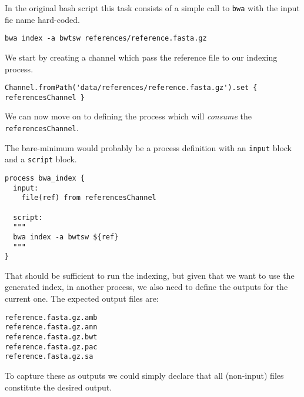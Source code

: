 In the original bash script this task consists of a simple call to \texttt{bwa} with 
the input fie name hard-coded. %

\begin{lstlisting}
bwa index -a bwtsw references/reference.fasta.gz
\end{lstlisting}

We start by creating a channel which pass the reference file to our indexing process. 

\begin{lstlisting}
Channel.fromPath('data/references/reference.fasta.gz').set { referencesChannel } 
\end{lstlisting}

We can now move on to defining the process which will \emph{consume} the \texttt{referencesChannel}.

The bare-minimum would probably be a process definition with 
an \texttt{input} block and a \texttt{script} block.

\begin{lstlisting}
process bwa_index {
  input:
    file(ref) from referencesChannel

  script:
  """
  bwa index -a bwtsw ${ref}
  """
}
\end{lstlisting}



%
%
%
%    

That should be sufficient to run the indexing, but given that we want to use the generated index,
in another process, we also need to define the outputs for the current one. 
The expected output files are:

\begin{lstlisting}
reference.fasta.gz.amb
reference.fasta.gz.ann
reference.fasta.gz.bwt
reference.fasta.gz.pac
reference.fasta.gz.sa
\end{lstlisting}

To capture these as outputs we could simply declare that all (non-input)
files constitute the desired output.

